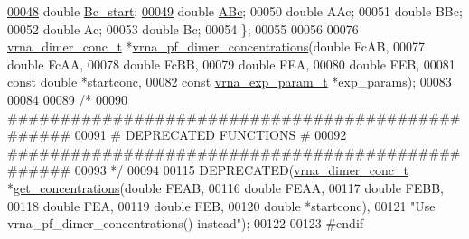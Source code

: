 \begin{DoxyCode}
\hyperlink{structvrna__dimer__conc__s_a5763381efee22a0bbec2f2d0754f7697}{00048}   \textcolor{keywordtype}{double}  \hyperlink{structvrna__dimer__conc__s_a5763381efee22a0bbec2f2d0754f7697}{Bc\_start};   
\hyperlink{structvrna__dimer__conc__s_aef56a1fe8d7f07e7b5d9a65417dda8a4}{00049}   \textcolor{keywordtype}{double}  \hyperlink{structvrna__dimer__conc__s_aef56a1fe8d7f07e7b5d9a65417dda8a4}{ABc};        
00050   \textcolor{keywordtype}{double}  AAc;
00051   \textcolor{keywordtype}{double}  BBc;
00052   \textcolor{keywordtype}{double}  Ac;
00053   \textcolor{keywordtype}{double}  Bc;
00054 \};
00055 
00056 
00076 \hyperlink{structvrna__dimer__conc__s}{vrna\_dimer\_conc\_t} *\hyperlink{group__pf__cofold_ga83b8d5d0f7875d6d5013b208f23e3356}{vrna\_pf\_dimer\_concentrations}(\textcolor{keywordtype}{double}        
                FcAB,
00077                                                 \textcolor{keywordtype}{double}                  FcAA,
00078                                                 \textcolor{keywordtype}{double}                  FcBB,
00079                                                 \textcolor{keywordtype}{double}                  FEA,
00080                                                 \textcolor{keywordtype}{double}                  FEB,
00081                                                 \textcolor{keyword}{const} \textcolor{keywordtype}{double}            *startconc,
00082                                                 \textcolor{keyword}{const} \hyperlink{group__energy__parameters_structvrna__exp__param__s}{vrna\_exp\_param\_t}  *exp\_params);
00083 
00084 
00089 \textcolor{comment}{/*}
00090 \textcolor{comment}{ #################################################}
00091 \textcolor{comment}{ # DEPRECATED FUNCTIONS                          #}
00092 \textcolor{comment}{ #################################################}
00093 \textcolor{comment}{ */}
00094 
00115 DEPRECATED(\hyperlink{structvrna__dimer__conc__s}{vrna\_dimer\_conc\_t} *\hyperlink{concentrations_8h_a163159722a422ba90335a601fc34b8fb}{get\_concentrations}(\textcolor{keywordtype}{double} FEAB,
00116                                                  \textcolor{keywordtype}{double} FEAA,
00117                                                  \textcolor{keywordtype}{double} FEBB,
00118                                                  \textcolor{keywordtype}{double} FEA,
00119                                                  \textcolor{keywordtype}{double} FEB,
00120                                                  \textcolor{keywordtype}{double} *startconc),
00121           \textcolor{stringliteral}{"Use vrna\_pf\_dimer\_concentrations() instead"});
00122 
00123 \textcolor{preprocessor}{#endif}
\end{DoxyCode}
